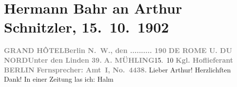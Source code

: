 

         
         \newcommand{\erwaehntePersonen}{Personen: Alfred Halm, Adolph Mühling, Karl Strecker, Hermann Sudermann}
         \newcommand{\erwaehnteOrte}{Orte: Berlin, Hotel de Rome, Unter den Linden}
         \newcommand{\erwaehnteWerke}{Werke: Berliner Theater. Hermann Bahr: »Wienerinnen«. (Eine nicht einwandfreie Kritik), Tägliche Rundschau, Wienerinnen. Lustspiel in drei Akten}
               \section[Hermann Bahr an Arthur Schnitzler, 15. 10. 1902]{ Hermann Bahr an Arthur Schnitzler, 15. 10. 1902}\nopagebreak{}\rehead{ }\begin{ledgroupsized}[t]{13cm}\normalsize\beginnumbering \toendnotes[C]{\smallbreak\pagebreak[2]} 
\toendnotes[C]{\smallbreak}\pstart
           \noindent{}{\pb}\textcolor{gray}{\textbf{GRAND HÔTEL}}\hfill \textcolor{gray}{\textbf{Berlin N. W., den .......... 190}}\pend
           \pstart
           \textcolor{gray}{\textbf{DE ROME U. DU NORD}}\hfill \textcolor{gray}{\textbf{Unter den Linden 39.}}\pend
           \pstart
           \textcolor{gray}{\textbf{A. MÜHLING}}\hfill 15. 10\pend
           \pstart
           \textcolor{gray}{\textbf{Kgl. Hoflieferant}}\pend
           \pstart
           \textcolor{gray}{\textbf{BERLIN}}\pend
           \pstart
           \textcolor{gray}{\textbf{Fernsprecher: Amt I, No. 4438.}}\pend
           \pstart\center{}Lieber Arthur!\pend\pstart
           Herzlichſten Dank! In einer Zeitung las ich: Halm

\end{ledgroupsized}
